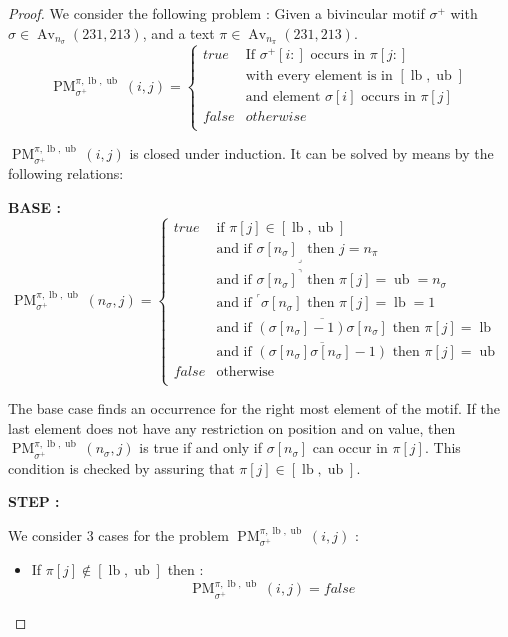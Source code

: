 \documentclass[a4paper]{llncs}
\DeclareMathOperator{\Avd}{Av}
\newcommand\Av[2]{\Avd_{{#1}}({#2})}
\newcommand{\ptext}{\pi}
\newcommand{\pmotif}{\sigma}
\newcommand{\pbmotif}{\pmotif^+}
\DeclareMathOperator{\PMa}{PM}
\newcommand{\PM}[6]{\PMa_{{#1}}^{{#2},{#3},{#4}}({#5},{#6})}
\DeclareMathOperator{\lb}{lb}
\DeclareMathOperator{\ub}{ub}
\begin{document}
\begin{proof}
We consider the following problem :
Given a bivincular motif $\pbmotif$ with $\pmotif \in \Av{n_\pmotif}{231,213} $, and a text $\ptext \in \Av{n_\ptext}{231,213}$.
$$
\PM{\pbmotif}{\ptext}{\lb}{\ub}{i}{j}=
\begin{cases}
	true 	& \text{If $\pbmotif[i:]$ occurs in $\ptext[j:]$}\\
			& \text{with every element is in $[\lb,\ub]$}\\
			& \text{and element $\pmotif[i]$ occurs in $\ptext[j]$ }\\
	false 	& otherwise\\
\end{cases}
$$

$\PM{\pbmotif}{\ptext}{\lb}{\ub}{i}{j}$ is closed under induction.
It can be solved by means by the following relations:

\noindent\textbf{BASE :} \\
$$
\PM{\pbmotif}{\ptext}{\lb}{\ub}{n_\pmotif}{j}=
\begin{cases}
	true 	& \text{if $\ptext[j] \in [\lb,\ub ]$}\\
			& \text{and if ${\pmotif[n_\pmotif]}_\lrcorner$ then $j=n_\ptext$}\\
			& \text{and if ${\pmotif[n_\pmotif]}^\urcorner$ then $\ptext[j]=\ub=n_\pmotif$}\\
			& \text{and if  $^\ulcorner{\pmotif[n_\pmotif]}$ then $\ptext[j]=\lb=1$ } \\
			& \text{and if  $\overline{(\pmotif[n_\pmotif]-1)\pmotif[n_\pmotif] }$ then $\ptext[j]=\lb$ }  \\
			& \text{and if  $\overline{(\pmotif[n_\pmotif]\pmotif[n_\pmotif]-1)}$ then $\ptext[j]=\ub$}  \\

	false	& \text{otherwise} \\
\end{cases}
$$

The base case finds an occurrence for the right most element of the motif. If the last element does not have any restriction on position and on value, then $\PM{\pbmotif}{\ptext}{\lb}{\ub}{n_\pmotif}{j}$ is true if and only if $\pmotif[n_\pmotif]$ can occur in $\ptext[j]$. This condition is checked by assuring that $\ptext[j] \in [\lb,\ub]$. 

\noindent\textbf{STEP :} 

We consider 3 cases for the problem $\PM{\pbmotif}{\ptext}{\lb}{\ub}{i}{j}$ :
\begin{itemize}
	\item If $\ptext[j] \notin [\lb,\ub]$ then :
	$$
	\PM{\pbmotif}{\ptext}{\lb}{\ub}{i}{j} = false
	$$


\end{itemize}
\end{proof}
\end{document}

